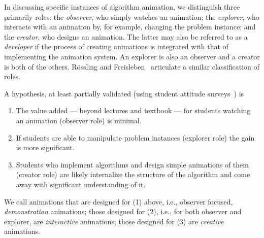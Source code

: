In discussing specific instances of algorithm animation,
we distinguish three primarily roles: the \emph{observer}, who simply
watches an animation; the \emph{explorer}, who interacts with an animation by,
for example, changing the problem instance; and the \emph{creator}, who
designs an animation. The latter may also be referred to as a
\emph{developer} if the process of creating animations is integrated with
that of implementing the animation system. An explorer is also an observer and a creator is both of
the others.
R\"ossling and Freisleben~\cite{2002-JVLC-Roessling} articulate a similar
classification of roles.


A hypothesis, at least partially validated (using student attitude
surveys~\cite{1997-SIGCSE-Stasko}) is
\begin{enumerate}
  \item
    The value added --- beyond lectures and textbook
    --- for students watching an animation (observer role)
    is minimal.
  \item
    If students are able to manipulate problem instances (explorer role)
    the gain is more significant.
  \item
    Students who implement algorithms and design simple animations of them
    (creator role) are likely internalize the structure of the algorithm and
    come away with significant understanding of it.
\end{enumerate}

We call animations that are designed for (1) above, i.e., observer focused,
\emph{demonstration} animations;
those designed for (2), i.e., for both observer and explorer, are
\emph{interactive} animations; those designed for (3) are
\emph{creative} animations.


